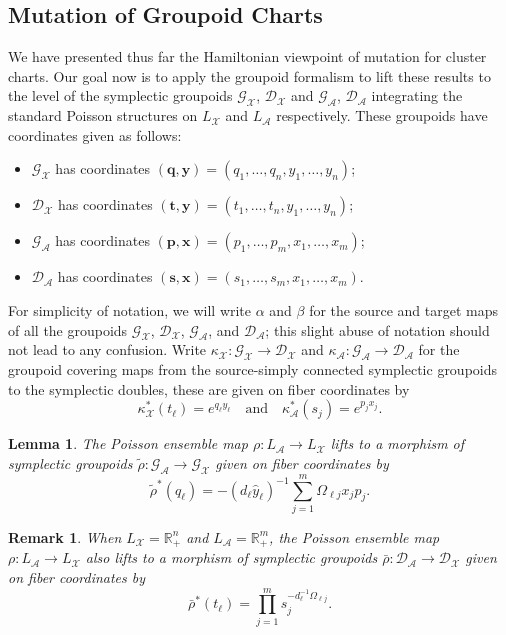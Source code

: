 \documentclass{amsart}
\newtheorem{lemma}[theorem]{Lemma}
\newtheorem{remark}[theorem]{Remark}
\numberwithin{equation}{section}
\newcommand{\bfp}{\mathbf{p}}
\newcommand{\bfq}{\mathbf{q}}
\newcommand{\bfs}{\mathbf{s}}
\newcommand{\bft}{\mathbf{t}}
\newcommand{\bfx}{\mathbf{x}}
\newcommand{\bfy}{\mathbf{y}}
\newcommand{\cA}{\mathcal{A}}
\newcommand{\cG}{\mathcal{G}}
\newcommand{\cD}{\mathcal{D}}
\newcommand{\cX}{\mathcal{X}}
\newcommand{\RR}{\mathbb{R}}
\begin{document}
\subsection{Mutation of Groupoid Charts}
We have presented thus far the Hamiltonian viewpoint of mutation for cluster charts.
Our goal now is to apply the groupoid formalism to lift these results to the level of the symplectic groupoids $\cG_\cX$, $\cD_\cX$ and $\cG_\cA$, $\cD_\cA$ integrating the standard Poisson structures on $L_\cX$ and $L_\cA$ respectively.
These groupoids have coordinates given as follows:
\begin{itemize}
  \item $\cG_\cX$ has coordinates $(\bfq,\bfy)=(q_1,\ldots,q_n,y_1,\ldots,y_n)$; 
  \item $\cD_\cX$ has coordinates $(\bft,\bfy)=(t_1,\ldots,t_n,y_1,\ldots,y_n)$; 
  \item $\cG_\cA$ has coordinates $(\bfp,\bfx)=(p_1,\ldots,p_m,x_1,\ldots,x_m)$; 
  \item $\cD_\cA$ has coordinates $(\bfs,\bfx)=(s_1,\ldots,s_m,x_1,\ldots,x_m)$.
\end{itemize}
For simplicity of notation, we will write $\alpha$ and $\beta$ for the source and target maps of all the groupoids $\cG_\cX$, $\cD_\cX$, $\cG_\cA$, and $\cD_\cA$; this slight abuse of notation should not lead to any confusion.
Write $\kappa_\cX:\cG_\cX\to\cD_\cX$ and $\kappa_\cA:\cG_\cA\to\cD_\cA$ for the groupoid covering maps from the source-simply connected symplectic groupoids to the symplectic doubles, these are given on fiber coordinates by
\[\kappa_\cX^*(t_\ell)=e^{q_\ell y_\ell}\quad\text{and}\quad\kappa_\cA^*(s_j)=e^{p_j x_j}.\]
\begin{lemma}
  The Poisson ensemble map $\rho:L_\cA\to L_\cX$ lifts to a morphism of symplectic groupoids $\tilde\rho:\cG_\cA\to\cG_\cX$ given on fiber coordinates by 
  \[\tilde\rho^*(q_\ell)=-(d_\ell\hat y_\ell)^{-1}\sum\limits_{j=1}^m\Omega_{\ell j}x_jp_j.\]
\end{lemma}
\begin{remark}
  When $L_\cX=\RR_+^n$ and $L_\cA=\RR_+^m$, the Poisson ensemble map $\rho:L_\cA\to L_\cX$ also lifts to a morphism of symplectic groupoids $\bar\rho:\cD_\cA\to\cD_\cX$ given on fiber coordinates by 
  \[\bar\rho^*(t_\ell)=\prod\limits_{j=1}^m s_j^{-d_\ell^{-1}\Omega_{\ell j}}.\]
\end{remark}
\end{document}
